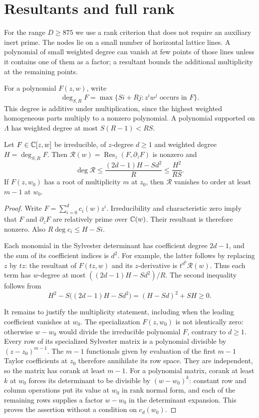\section{Resultants and full rank}\label{app:resultants}
For the range $D\geq875$ we use a rank criterion that does not require
an auxiliary inert prime. The nodes lie on a small number of horizontal
lattice lines. A polynomial of small weighted degree can vanish at few
points of those lines unless it contains one of them as a factor;
a resultant bounds the additional multiplicity at the remaining points.

For a polynomial $F(z,w)$, write
\[
 \deg_{S,R}F=\max\{Si+Rj:z^iw^j\text{ occurs in }F\}.
\]
This degree is additive under multiplication, since the highest weighted
homogeneous parts multiply to a nonzero polynomial. A polynomial supported
on $\Lambda$ has weighted degree at most $S(R-1)<RS$.

\begin{lemma}\label{lem:weighted-resultant}
Let $F\in\mathbb C[z,w]$ be irreducible, of $z$-degree $d\geq1$ and weighted
degree $H=\deg_{S,R}F$. Then $\mathcal R(w)=\operatorname{Res}_z(F,\partial_zF)$
is nonzero and
\[
 \deg\mathcal R\leq\frac{(2d-1)H-Sd^2}{R}
                  \leq\frac{H^2}{RS}.
\]
If $F(z,w_0)$ has a root of multiplicity $m$ at $z_0$, then
$\mathcal R$ vanishes to order at least $m-1$ at $w_0$.
\end{lemma}
\begin{proof}
Write $F=\sum_{i=0}^d c_i(w)z^i$. Irreducibility and characteristic zero
imply that $F$ and $\partial_zF$ are relatively prime over $\mathbb C(w)$.
Their resultant is therefore nonzero. Also
$R\deg c_i\leq H-Si$.

Each monomial in the Sylvester determinant has coefficient degree
$2d-1$, and the sum of its coefficient indices is $d^2$.
For example, the latter follows by replacing $z$ by $tz$: the resultant
of $F(tz,w)$ and its $z$-derivative is $t^{d^2}\mathcal R(w)$.
Thus each term has $w$-degree at most $((2d-1)H-Sd^2)/R$.
The second inequality follows from
\[
 H^2-S\bigl((2d-1)H-Sd^2\bigr)=(H-Sd)^2+SH\geq0.
\]

It remains to justify the multiplicity statement, including when the
leading coefficient vanishes at $w_0$. The specialization $F(z,w_0)$
is not identically zero: otherwise $w-w_0$ would divide the irreducible
polynomial $F$, contrary to $d\geq1$. Every row of its specialized
Sylvester matrix is a polynomial divisible by $(z-z_0)^{m-1}$.
The $m-1$ functionals given by evaluation of the first $m-1$ Taylor
coefficients at $z_0$ therefore annihilate its row space. They are
independent, so the matrix has corank at least $m-1$.
For a polynomial matrix, corank at least $k$ at $w_0$ forces its
determinant to be divisible by $(w-w_0)^k$: constant row and column
operations put its value at $w_0$ in rank normal form, and each of the
remaining rows supplies a factor $w-w_0$ in the determinant expansion.
This proves the assertion without a condition on $c_d(w_0)$.
\end{proof}

